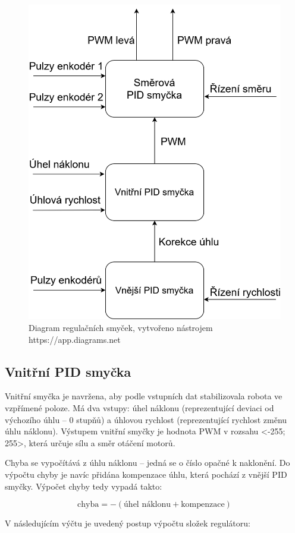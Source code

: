 \begin{figure}[H]
    \centering
    \includegraphics[width=0.75\linewidth]{obrazky-figures/PID.png}
    \caption {Diagram regulačních smyček, vytvořeno nástrojem https://app.diagrams.net}
    \label{PID}
\end{figure}

\subsection*{Vnitřní PID smyčka}
Vnitřní smyčka je navržena, aby podle vstupních dat stabilizovala robota ve vzpřímené poloze. Má dva vstupy: úhel náklonu (reprezentující deviaci od výchozího úhlu -- 0 stupňů) a úhlovou rychlost (reprezentující rychlost změnu úhlu náklonu). Výstupem vnitřní smyčky je hodnota PWM v rozsahu <-255; 255>, která určuje sílu a směr otáčení motorů. 

Chyba se vypočítává z úhlu náklonu -- jedná se o číslo opačné k naklonění. Do výpočtu chyby je navíc přidána kompenzace úhlu, která pochází z vnější PID smyčky. Výpočet chyby tedy vypadá takto:

\[
\text{chyba} = -(\text{úhel náklonu} + \text{kompenzace})
\]

V následujícím výčtu je uvedený postup výpočtu složek regulátoru:

